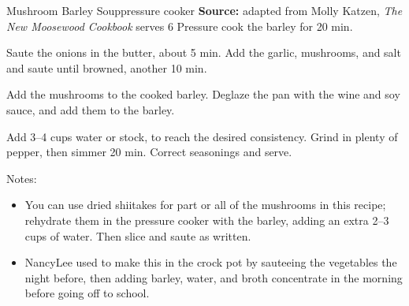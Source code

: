 \begin{recipe}{Mushroom Barley Soup}{pressure cooker \hfill }%
 {\textbf{Source:} adapted from Molly Katzen, \textit{The New Moosewood Cookbook} \hfill serves 6}
 Pressure cook the barley for 20 min.

 Saute the onions in the butter, about 5 min. Add the garlic, mushrooms, and salt and saute until browned, another 10 min.

 Add the mushrooms to the cooked barley. Deglaze the pan with the wine and soy sauce, and add them to the barley.

 Add 3--4 cups water or stock, to reach the desired consistency. Grind in plenty of pepper, then simmer 20 min. Correct seasonings and serve.

 \freeform Notes:
 \begin{itemize}
  \item You can use dried shiitakes for part or all of the mushrooms in this recipe; rehydrate them in the pressure cooker with the barley, adding an extra 2--3 cups of water. Then slice and saute as written.
  \item NancyLee used to make this in the crock pot by sauteeing the vegetables the night before, then adding barley, water, and broth concentrate in the morning before going off to school.
 \end{itemize}
\end{recipe}
